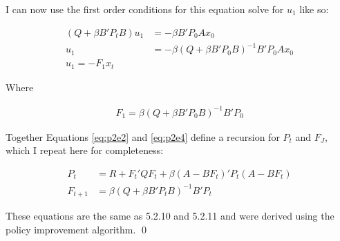 \begin{homeworkProblem}[Problem 5.2]
{    I can now use the first order conditions for this equation solve for $u_1$ like so:

    \begin{align} \label{eq:p2e3}
      \left(Q + \beta B'P_tB \right)u_1 &= -\beta B'P_0Ax_0 \\
      u_1 &= - \beta \left(Q + \beta B'P_0B \right)^{-1}B'P_0Ax_0 \\
      u_1 = -F_1 x_t
    \end{align}

    Where

    \begin{align} \label{eq:p2e4}
      F_1 = \beta \left(Q + \beta B'P_0B \right)^{-1}B'P_0
    \end{align}

    Together Equations \ref{eq:p2e2} and \ref{eq:p2e4} define a recursion for $P_t$ and $F_J$, which I repeat here for completeness:

    \begin{align} \label{eq:p2e5}
      P_t &=  R  + F_t' Q F_t + \beta  (A - B F_t)' P_t(A  - B F_t) \\
      F_{t+1} &= \beta \left(Q + \beta B'P_tB \right)^{-1}B'P_t
    \end{align}

    These equations are the same as 5.2.10 and 5.2.11 and were derived using the policy improvement algorithm. \qed

  }

\end{homeworkProblem}

